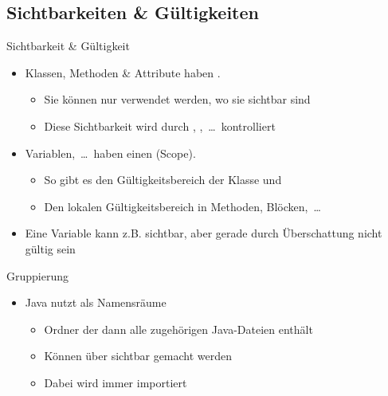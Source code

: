 {\subsection{Sichtbarkeiten \& Gültigkeiten}
\begin{frame}{Sichtbarkeit \& Gültigkeit}
   \begin{itemize}[<+(1)->]
      \itemsep14pt
      \item Klassen, Methoden \& Attribute haben . \begin{itemize}
         \item Sie können nur verwendet werden, wo sie sichtbar sind
         \item Diese Sichtbarkeit wird durch , ,~\ldots\ kontrolliert
      \end{itemize}
      \item Variablen,~\ldots\ haben einen  (Scope). \begin{itemize}
         \item So gibt es den Gültigkeitsbereich der Klasse und
         \item Den lokalen Gültigkeitsbereich in Methoden, Blöcken,~\ldots
      \end{itemize}
      \item Eine Variable kann z.B. sichtbar, aber gerade durch Überschattung nicht gültig sein
   \end{itemize}
\end{frame}

\begin{frame}[c]{Gruppierung}
   \begin{itemize}[<+(1)->]
      \itemsep14pt
      \item Java nutzt  als Namensräume \begin{itemize}
         \item Ordner der dann alle zugehörigen Java-Dateien enthält
         \item Können über  sichtbar gemacht werden
         \item Dabei wird  immer importiert
      \end{itemize}
   \end{itemize}
\end{frame}


}
